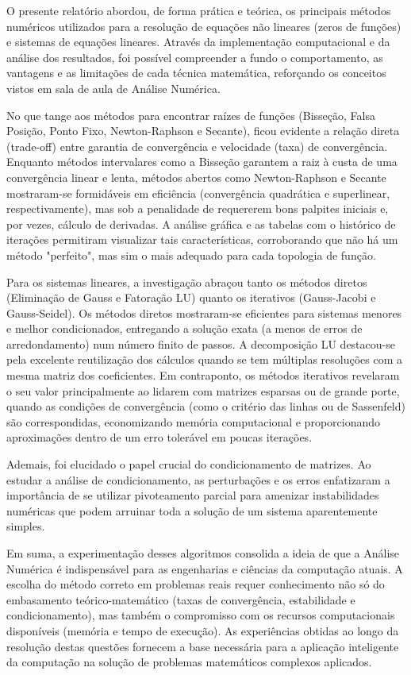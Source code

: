 O presente relatório abordou, de forma prática e teórica, os principais métodos numéricos utilizados para a resolução de equações não lineares (zeros de funções) e sistemas de equações lineares. Através da implementação computacional e da análise dos resultados, foi possível compreender a fundo o comportamento, as vantagens e as limitações de cada técnica matemática, reforçando os conceitos vistos em sala de aula de Análise Numérica.

No que tange aos métodos para encontrar raízes de funções (Bisseção, Falsa Posição, Ponto Fixo, Newton-Raphson e Secante), ficou evidente a relação direta (trade-off) entre garantia de convergência e velocidade (taxa) de convergência. Enquanto métodos intervalares como a Bisseção garantem a raiz à custa de uma convergência linear e lenta, métodos abertos como Newton-Raphson e Secante mostraram-se formidáveis em eficiência (convergência quadrática e superlinear, respectivamente), mas sob a penalidade de requererem bons palpites iniciais e, por vezes, cálculo de derivadas. A análise gráfica e as tabelas com o histórico de iterações permitiram visualizar tais características, corroborando que não há um método "perfeito", mas sim o mais adequado para cada topologia de função.

Para os sistemas lineares, a investigação abraçou tanto os métodos diretos (Eliminação de Gauss e Fatoração LU) quanto os iterativos (Gauss-Jacobi e Gauss-Seidel). Os métodos diretos mostraram-se eficientes para sistemas menores e melhor condicionados, entregando a solução exata (a menos de erros de arredondamento) num número finito de passos. A decomposição LU destacou-se pela excelente reutilização dos cálculos quando se tem múltiplas resoluções com a mesma matriz dos coeficientes. Em contraponto, os métodos iterativos revelaram o seu valor principalmente ao lidarem com matrizes esparsas ou de grande porte, quando as condições de convergência (como o critério das linhas ou de Sassenfeld) são correspondidas, economizando memória computacional e proporcionando aproximações dentro de um erro tolerável em poucas iterações.

Ademais, foi elucidado o papel crucial do condicionamento de matrizes. Ao estudar a análise de condicionamento, as perturbações e os erros enfatizaram a importância de se utilizar pivoteamento parcial para amenizar instabilidades numéricas que podem arruinar toda a solução de um sistema aparentemente simples. 

Em suma, a experimentação desses algoritmos consolida a ideia de que a Análise Numérica é indispensável para as engenharias e ciências da computação atuais. A escolha do método correto em problemas reais requer conhecimento não só do embasamento teórico-matemático (taxas de convergência, estabilidade e condicionamento), mas também o compromisso com os recursos computacionais disponíveis (memória e tempo de execução). As experiências obtidas ao longo da resolução destas questões fornecem a base necessária para a aplicação inteligente da computação na solução de problemas matemáticos complexos aplicados.